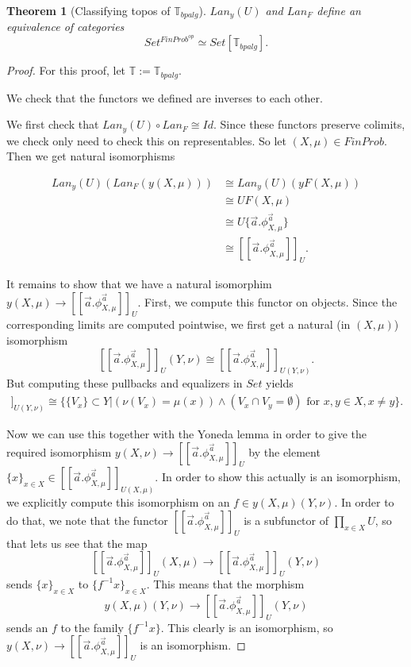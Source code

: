 \documentclass[a4paper]{amsproc}
\theoremstyle{plain}
\newtheorem{theorem}{Theorem}[section]
\theoremstyle{definition}
\theoremstyle{remark}
\numberwithin{equation}{section}
\newcommand{\ldoub}{[\![ }
\newcommand{\rdoub}{]\!]}
\begin{document}
\begin{theorem}[Classifying topos of $\mathbb{T}_{bpalg}$] \label{classifying_presheaf}
$Lan_y(U)$ and $Lan_F$ define an equivalence of categories
\[
Set^{FinProb^{op}} \simeq Set[\mathbb{T}_{bpalg}].
\]
\end{theorem}
\begin{proof}
For this proof, let $\mathbb{T} := \mathbb{T}_{bpalg}$.

We check that the functors we defined are inverses to each other.

We first check that $Lan_y(U) \circ Lan_F \cong Id$. Since these functors preserve colimits, we check only need to check this on representables. So let $(X,\mu) \in FinProb$. Then we get natural isomorphisms

\begin{align*}
Lan_y(U)(Lan_F(y(X,\mu))) &\cong Lan_y(U)(yF(X,\mu)) \\
&\cong UF(X,\mu) \\
&\cong U \{\vec{a} . \phi^{\vec{a}}_{X,\mu}\} \\
&\cong \ldoub \vec{a} . \phi^{\vec{a}}_{X,\mu} \rdoub_U .
\end{align*}

It remains to show that we have a natural isomorphim $y (X,\mu) \to \ldoub \vec{a} . \phi^{\vec{a}}_{X,\mu} \rdoub_U$. First, we compute this functor on objects. Since the corresponding limits are computed pointwise, we first get a natural (in $(X,\mu)$) isomorphism
\[
\ldoub \vec{a} . \phi^{\vec{a}}_{X,\mu} \rdoub_U (Y,\nu) \cong \ldoub \vec{a} . \phi^{\vec{a}}_{X,\mu} \rdoub_{U(Y,\nu)} .
\]
But computing these pullbacks and equalizers in $Set$ yields
\begin{align*}
\ldoub \vec{a} . \phi^{\vec{a}}_{X,\mu} \rdoub_{U(Y,\nu)} \cong
\{\{V_x\} \subset Y | (\nu(V_x) = \mu(x)) \wedge (V_x \cap V_y = \emptyset) \text{ for } x,y \in X, x \neq y\} .
\end{align*}

Now we can use this together with the Yoneda lemma in order to give the required isomorphism $y (X,\nu) \to \ldoub \vec{a} . \phi^{\vec{a}}_{X,\mu} \rdoub_U$ by the element $\{x\}_{x \in X} \in \ldoub \vec{a} . \phi^{\vec{a}}_{X,\mu} \rdoub_{U(X,\mu)}$. In order to show this actually is an isomorphism, we explicitly compute this isomorphism on an $f \in y (X,\mu) (Y,\nu)$. In order to do that, we note that the functor $\ldoub \vec{a} . \phi^{\vec{a}}_{X,\mu} \rdoub_U$ is a subfunctor of $\prod_{x \in X} U$, so that lets us see that the map
\[
\ldoub \vec{a} . \phi^{\vec{a}}_{X,\mu} \rdoub_U(X,\mu) \to \ldoub \vec{a} . \phi^{\vec{a}}_{X,\mu} \rdoub_U(Y,\nu)
\]
sends $\{x\}_{x \in X}$ to $\{f^{-1} x\}_{x \in X}$. This means that the morphism
\[
y (X,\mu) (Y,\nu) \to \ldoub \vec{a} . \phi^{\vec{a}}_{X,\mu} \rdoub_U(Y,\nu)
\]
sends an $f$ to the family $\{f^{-1} x\}$. This clearly is an isomorphism, so $y (X,\nu) \to \ldoub \vec{a} . \phi^{\vec{a}}_{X,\mu} \rdoub_U$ is an isomorphism.


\end{proof}
\end{document}
